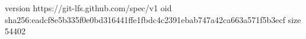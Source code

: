 version https://git-lfs.github.com/spec/v1
oid sha256:eadcf8e5b335f0e0bd316441ffe1fbdc4c2391ebab747a42ca663a571f5b3ecf
size 54402
